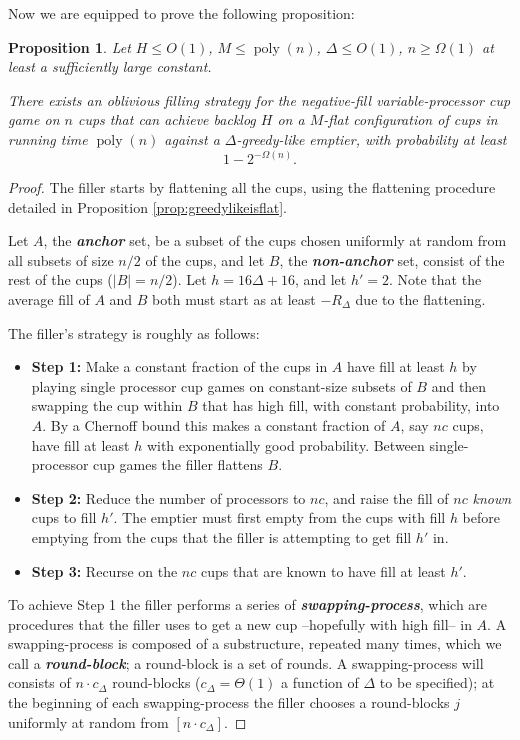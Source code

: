 \documentclass[twocolumn]{article}[10pt]
\newcommand{\defn}[1]{{\textit{\textbf{\boldmath #1}}}\xspace}
\DeclareMathOperator{\poly}{\text{poly}}
\newtheorem{proposition}{Proposition}
\begin{document}
Now we are equipped to prove the following proposition:
\begin{proposition}
  \label{prop:obliviousBase}
  Let $H \le O(1)$, $M \le \poly(n)$, $\Delta \le O(1)$, $n \ge \Omega(1)$ at
  least a sufficiently large constant. 

  There exists an oblivious filling strategy for the negative-fill
  variable-processor cup game on $n$ cups that can achieve backlog $H$ on a
  $M$-flat configuration of cups in running time $\poly(n)$ against a
  $\Delta$-greedy-like emptier, with probability at least $$1-2^{-\Omega(n)}.$$
\end{proposition}
\begin{proof}
  The filler starts by flattening all the cups, using the
  flattening procedure detailed in Proposition
  \ref{prop:greedylikeisflat}. 

  Let $A$, the \defn{anchor} set, be a subset of the cups chosen uniformly at
  random from all subsets of size $n/2$ of the cups, and let $B$, the
  \defn{non-anchor} set, consist of the rest of the cups ($|B| = n/2$). Let $h
  = 16\Delta + 16$, and let $h' = 2$. Note that the average fill of $A$ and $B$
  both must start as at least $-R_\Delta$ due to the flattening.

  The filler's strategy is roughly as follows: 
  \begin{itemize}
    \item \textbf{Step 1:} Make a constant fraction of the cups in $A$ have
      fill at least $h$ by playing single processor cup games on constant-size
      subsets of $B$ and then swapping the cup within $B$ that has high fill,
      with constant probability, into $A$. By a Chernoff bound this makes a
      constant fraction of $A$, say $nc$ cups, have fill at least $h$ with
      exponentially good probability. Between single-processor cup games the
      filler flattens $B$.
    \item \textbf{Step 2:} Reduce the number of processors to $nc$, and raise
      the fill of $nc$ \emph{known} cups to fill $h'$. The emptier must first
      empty from the cups with fill $h$ before emptying from the cups that
      the filler is attempting to get fill $h'$ in.
    \item \textbf{Step 3:} Recurse on the $nc$ cups that are known to have fill
      at least $h'$.
  \end{itemize}

To achieve Step 1 the filler performs a series of \defn{swapping-process},
which are procedures that the filler uses to get a new cup --hopefully with
high fill-- in $A$. A swapping-process is composed of a substructure, repeated
many times, which we call a \defn{round-block}; a round-block is a set of
rounds. A swapping-process will consists of $n\cdot c_\Delta$ round-blocks
($c_\Delta = \Theta(1)$ a function of $\Delta$ to be specified); at the beginning
of each swapping-process the filler chooses a round-blocks $j$ uniformly at
random from $[n\cdot c_\Delta]$. 


\end{proof}
\end{document}
